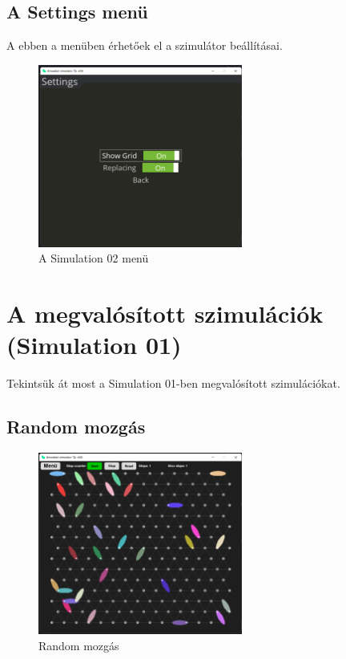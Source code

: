 \documentclass[	
  noindent
]{elteikthesis}[2024/04/26]
\begin{document}
        \subsection{A Settings menü}
        A ebben a menüben érhetőek el a szimulátor beállításai.

        \begin{figure}[H]
          \centering
          \includegraphics[width=0.6\textwidth]{images/simulatons/settings.png}
          \caption{A Simulation 02 menü}
          \label{fig:settings}
        \end{figure}
        \cleardoublepage

    \section{A megvalósított szimulációk (Simulation 01)}
        Tekintsük át most a Simulation 01-ben megvalósított szimulációkat.

        \subsection{Random mozgás}
        \begin{figure}[H]
          \centering
          \includegraphics[width=0.6\textwidth]{images/simulatons/01_random.png}
          \caption{Random mozgás}
          \label{fig:01_random}
        \end{figure}
\end{document}
